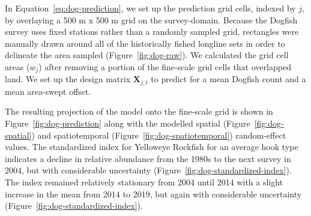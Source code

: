 \documentclass[11pt]{book}
\begin{document}
In Equation~\ref{eq:dog-prediction}, we set up the prediction grid cells, indexed by \(j\), by overlaying a 500 m x 500 m grid on the survey-domain. Because the Dogfish survey uses fixed stations rather than a randomly sampled grid, rectangles were manually drawn around all of the historically fished longline sets in order to delineate the area sampled (Figure~\ref{fig:dog-raw}). We calculated the grid cell areas (\(w_j\)) after removing a portion of the fine-scale grid cells that overlapped land. We set up the design matrix \(\bm{X}_{j,t}\) to predict for a mean Dogfish count and a mean area-swept offset.

The resulting projection of the model onto the fine-scale grid is shown in Figure~\ref{fig:dog-prediction} along with the modelled spatial (Figure~\ref{fig:dog-spatial}) and spatiotemporal (Figure~\ref{fig:dog-spatiotemporal}) random-effect values. The standardized index for Yelloweye Rockfish for an average hook type indicates a decline in relative abundance from the 1980s to the next survey in 2004, but with considerable uncertainty (Figure~\ref{fig:dog-standardized-index}). The index remained relatively stationary from 2004 until 2014 with a slight increase in the mean from 2014 to 2019, but again with considerable uncertainty (Figure~\ref{fig:dog-standardized-index}).
\end{document}
